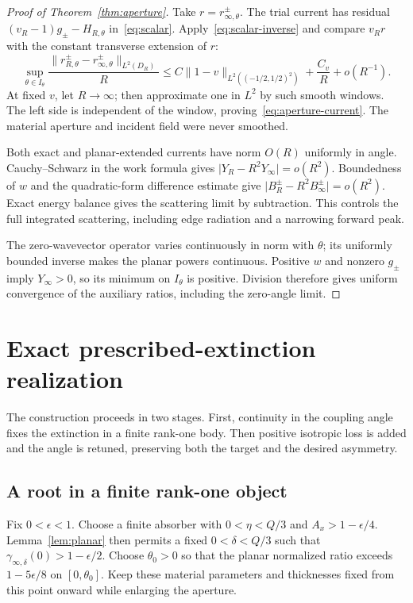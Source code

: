 \documentclass[11pt]{article}
\newcommand{\norm}[1]{\lVert #1\rVert}
\newcommand{\abs}[1]{\lvert #1\rvert}
\begin{document}
\begin{proof}[Proof of Theorem~\ref{thm:aperture}]
Take $r=r_{\infty,\theta}^\pm$. The trial current has residual $(v_R-1)g_\pm-H_{R,\theta}$ in~\eqref{eq:scalar}. Apply~\eqref{eq:scalar-inverse} and compare $v_Rr$ with the constant transverse extension of $r$:
\begin{equation}\label{eq:current-error}
 \sup_{\theta\in I_\theta}\frac{\norm{r_{R,\theta}^\pm-r_{\infty,\theta}^\pm}_{L^2(D_R)}}{R}
 \leq C\norm{1-v}_{L^2((-1/2,1/2)^2)}+\frac{C_v}{R}+o(R^{-1}).
\end{equation}
At fixed $v$, let $R\to\infty$; then approximate one in $L^2$ by such smooth windows. The left side is independent of the window, proving~\eqref{eq:aperture-current}. The material aperture and incident field were never smoothed.

Both exact and planar-extended currents have norm $O(R)$ uniformly in angle. Cauchy--Schwarz in the work formula gives $\abs{Y_R-R^2Y_\infty}=o(R^2)$. Boundedness of $w$ and the quadratic-form difference estimate give $\abs{B_R^\pm-R^2B_\infty^\pm}=o(R^2)$. Exact energy balance gives the scattering limit by subtraction. This controls the full integrated scattering, including edge radiation and a narrowing forward peak.

The zero-wavevector operator varies continuously in norm with $\theta$; its uniformly bounded inverse makes the planar powers continuous. Positive $w$ and nonzero $g_\pm$ imply $Y_\infty>0$, so its minimum on $I_\theta$ is positive. Division therefore gives uniform convergence of the auxiliary ratios, including the zero-angle limit.
\end{proof}

\section{Exact prescribed-extinction realization}\label{sec:realization}
The construction proceeds in two stages. First, continuity in the coupling angle fixes the extinction in a finite rank-one body. Then positive isotropic loss is added and the angle is retuned, preserving both the target and the desired asymmetry.

\subsection{A root in a finite rank-one object}
Fix $0<\epsilon<1$. Choose a finite absorber with $0<\eta<Q/3$ and $A_x>1-\epsilon/4$. Lemma~\ref{lem:planar} then permits a fixed $0<\delta<Q/3$ such that $\gamma_{\infty,\delta}(0)>1-\epsilon/2$. Choose $\theta_0>0$ so that the planar normalized ratio exceeds $1-5\epsilon/8$ on $[0,\theta_0]$. Keep these material parameters and thicknesses fixed from this point onward while enlarging the aperture.
\end{document}
